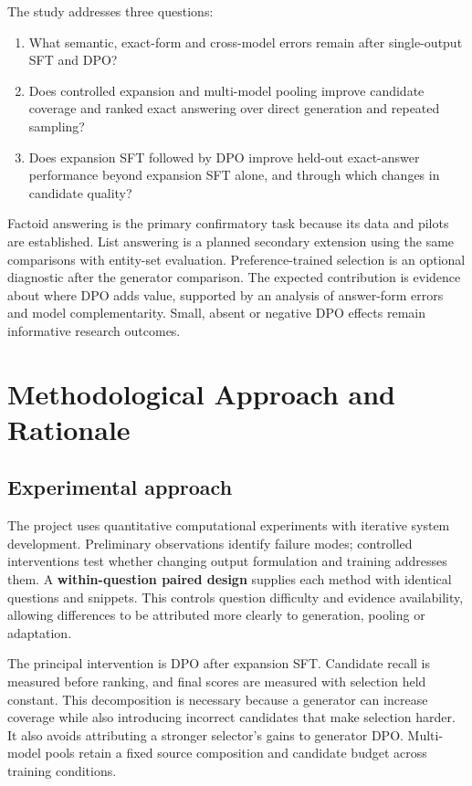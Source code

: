 \documentclass[12pt,a4paper]{article}
\begin{document}
The study addresses three questions:

\begin{enumerate}[label=\textbf{RQ\arabic*:}]
  \item What semantic, exact-form and cross-model errors remain after single-output SFT and DPO?
  \item Does controlled expansion and multi-model pooling improve candidate coverage and ranked exact answering over direct generation and repeated sampling?
  \item Does expansion SFT followed by DPO improve held-out exact-answer performance beyond expansion SFT alone, and through which changes in candidate quality?
\end{enumerate}

Factoid answering is the primary confirmatory task because its data and pilots are established. List answering is a planned secondary extension using the same comparisons with entity-set evaluation. Preference-trained selection is an optional diagnostic after the generator comparison. The expected contribution is evidence about where DPO adds value, supported by an analysis of answer-form errors and model complementarity. Small, absent or negative DPO effects remain informative research outcomes.

\section{Methodological Approach and Rationale}

\subsection{Experimental approach}

The project uses quantitative computational experiments with iterative system development. Preliminary observations identify failure modes; controlled interventions test whether changing output formulation and training addresses them. A \textbf{within-question paired design} supplies each method with identical questions and snippets. This controls question difficulty and evidence availability, allowing differences to be attributed more clearly to generation, pooling or adaptation.

The principal intervention is DPO after expansion SFT. Candidate recall is measured before ranking, and final scores are measured with selection held constant. This decomposition is necessary because a generator can increase coverage while also introducing incorrect candidates that make selection harder. It also avoids attributing a stronger selector's gains to generator DPO. Multi-model pools retain a fixed source composition and candidate budget across training conditions.
\end{document}

